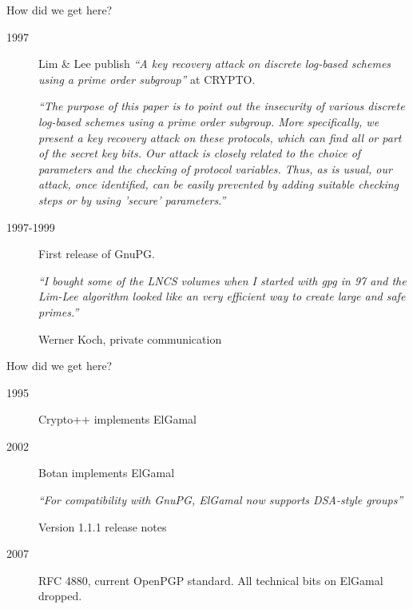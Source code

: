 \documentclass[aspectratio=169]{beamer}
\begin{document}

\begin{frame}{How did we get here?}
  \begin{description}
  \item[1997] Lim \& Lee publish \textit{``A key recovery attack on
      discrete log-based schemes using a prime order subgroup''} at
    CRYPTO.\\[1em]
    \begin{minipage}{0.9\linewidth}
      \small\it ``The purpose of this paper is to point out the
      insecurity of various discrete log-based schemes using a prime
      order subgroup. More specifically, we present a key recovery
      attack on these protocols, which can find all or part of the
      secret key bits. Our attack is closely related to the choice of
      parameters and the checking of protocol variables. Thus, as is
      usual, our attack, once identified, can be easily prevented by
      adding suitable checking steps or by using 'secure'
      parameters.''
    \end{minipage}
  \item[1997-1999] First release of GnuPG.\\[1em]
    \begin{minipage}{0.9\linewidth}
      \small\it ``I bought some of the LNCS volumes when I started
      with gpg in 97 and the Lim-Lee algorithm looked like an very
      efficient way to create large and safe primes.''

      \begin{flushright}
        Werner Koch, private communication
      \end{flushright}
    \end{minipage}
  \end{description}
\end{frame}


\begin{frame}{How did we get here?}
  \begin{description}
  \item[1995] Crypto++ implements ElGamal
  \item[2002] Botan implements ElGamal\\[1em]
    \begin{minipage}{0.9\linewidth}
      \small\it ``For compatibility with GnuPG, ElGamal now supports
      DSA-style groups''
      \begin{flushright}
        Version 1.1.1 release notes
      \end{flushright}
    \end{minipage}
  \item[2007] RFC 4880, current OpenPGP standard. All technical bits
    on ElGamal dropped.
  \end{description}
\end{frame}
\end{document}
